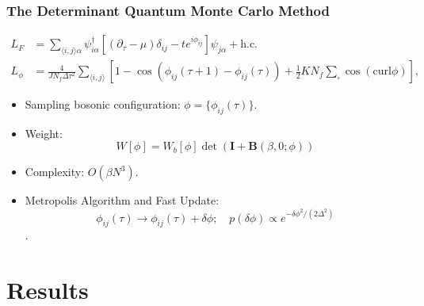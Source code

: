 \documentclass[xcolor=table, 10pt, aspectratio=169]{beamer}
\begin{document}
%

\begin{frame}
  \frametitle{The Determinant Quantum Monte Carlo Method}
  \begin{align*}
  L_F &= \sum_{\langle i,j \rangle\alpha}{\psi}^{\dagger}_{i\alpha} \left[(\partial_\tau -\mu)\delta_{ij}-t e^{i\phi_{ij}}   \right]   {\psi}_{j\alpha} + \text{h.c.}\\
  L_\phi &= \frac{4} {JN_{f}\Delta \tau ^2} \sum_{\langle i,j \rangle}
  \left[ 1-\cos(\phi_{ij}(\tau+1)-\phi_{ij}(\tau))
   +\frac{1}{2}K N_f\sum_{\square}\cos (\text{curl} \phi) \right],
\end{align*}
\begin{itemize}
  \item Sampling bosonic configuration: $\phi = \{\phi_{ij}(\tau)\}$.
  \item Weight:
  \[W[\phi] = W_b[\phi]\det(\mathbf I + \mathbf B(\beta,0;\phi))\]
  \item Complexity: $O(\beta N^3)$.
  \item Metropolis Algorithm and Fast Update:
  \[\phi_{ij}(\tau)\rightarrow\phi_{ij}(\tau)+\delta\phi;\quad p(\delta\phi)\propto e^{-\delta\phi^2/(2\Delta^2)}\].
\end{itemize}
\end{frame}

\section{Results}
\end{document}
